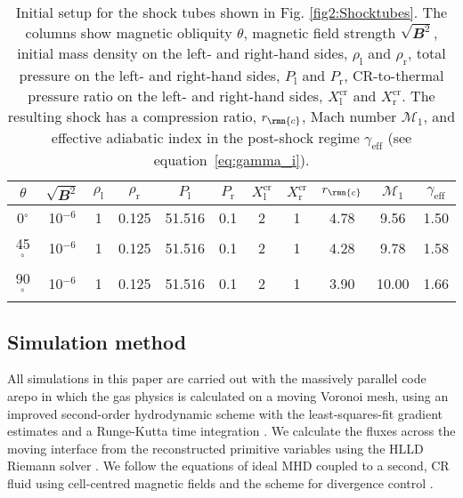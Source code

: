 \documentclass[8pt,a4paper,usenatbib]{mnras}
\newcommand{\mach}{\mathcal{M}}
\newcommand{\AREPO}{{\sc arepo}\xspace}
\newcommand{\vecbf}{\mathbfit}
\begin{document}
\begin{table*}
  \label{tab:1}
  \begin{tabular}{|c|c|c|c|c|c|c|c|c|c|c|}
    \hline 
    \hline
    $\theta$ & $\sqrt{\vecbf{B}^2}$ & $\rho_\mathrm{l}$ &  $\rho_\mathrm{r}$  & $P_\mathrm{l}$ &  $P_\mathrm{r}$ & $X^{\mathrm{cr}}_\mathrm{l}$  & $X^{\mathrm{cr}}_\mathrm{r}$ & $r_\rmn{c}$ & $\mach_1$ & $\gamma_{\mathrm{eff}}$ \\ 
    \hline 
    0$^{\circ}$& 10$^{-6}$ & 1 & 0.125 & 51.516 & 0.1 & 2 & 1 & 4.78 & 9.56 & 1.50\\ 
    45$^{\circ}$ & 10$^{-6}$ & 1 & 0.125 & 51.516 & 0.1 & 2 & 1 & 4.28 & 9.78 & 1.58\\ 
    90$^{\circ}$ & 10$^{-6}$ & 1 & 0.125 & 51.516 & 0.1 & 2 & 1 & 3.90 & 10.00 & 1.66\\ 
    \hline 
  \end{tabular}
  \centering
  \caption{Initial setup for the shock tubes shown in
    Fig. \ref{fig2:Shocktubes}. The columns show magnetic obliquity $\theta$,
    magnetic field strength $\sqrt{\vecbf{B}^2}$, initial mass density on the
    left- and right-hand sides, $\rho_\mathrm{l}$ and $\rho_\mathrm{r}$, total
    pressure on the left- and right-hand sides, $P_\mathrm{l}$ and
    $P_\mathrm{r}$, CR-to-thermal pressure ratio on the left- and right-hand
    sides, $X^{\mathrm{cr}}_\mathrm{l}$ and $X^{\mathrm{cr}}_\mathrm{r}$. The
    resulting shock has a compression ratio, $r_\rmn{c}$, Mach number $\mach_1$, and
    effective adiabatic index in the post-shock regime
    $\gamma_{\mathrm{eff}}$ (see equation~\ref{eq:gamma_i}). }
\end{table*}


\subsection{Simulation method}

All simulations in this paper are carried out with the massively parallel code
\AREPO \citep{2010MNRAS.401..791S} in which the gas physics is calculated on a
moving Voronoi mesh, using an improved second-order hydrodynamic scheme with
the least-squares-fit gradient estimates and a Runge-Kutta time integration
\citep{2016MNRAS.455.1134P}. We calculate the fluxes across the moving interface
from the reconstructed primitive variables using the HLLD Riemann solver
\citep{2005JCoPh.208..315M}.  We follow the equations of ideal MHD coupled to a
second, CR fluid using cell-centred magnetic fields and the
\citet{1999JCoPh.154..284P} scheme for divergence control
\citep{2011MNRAS.418.1392P, 2013MNRAS.432..176P}.
\end{document}
